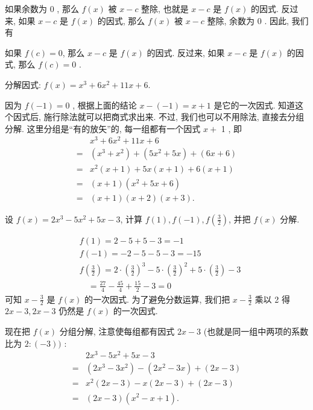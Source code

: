 如果余数为 0 , 那么 $f(x)$ 被 $x-c$ 整除, 也就是 $x-c$ 是 $f(x)$ 的因式. 反过来, 如果 $x-c$ 是 $f(x)$ 的因式, 那么 $f(x)$ 被 $x-c$ 整除, 余数为 0 . 因此, 我们有

如果 $f(c)=0$, 那么 $x-c$ 是 $f(x)$ 的因式. 反过来, 如果 $x-c$ 是 $f(x)$ 的因式, 那么 $f(c)=0$ .

\begin{example}
	分解因式: $f(x)=x^{3}+6 x^{2}+11 x+6$.
\end{example}
\begin{solution}
	因为 $f(-1)=0$ , 根据上面的结论 $x-(-1)=x+1$ 是它的一次因式. 知道这个因式后, 施行除法就可以把商式求出来. 不过, 我们也可以不用除法, 直接去分组分解. 这里分组是“有的放矢”的, 每一组都有一个因式 $x+$ 1 , 即
	\begin{align*}
		  & x^{3}+6 x^{2}+11 x+6                                      \\
		= & \left(x^{3}+x^{2}\right)+\left(5 x^{2}+5 x\right)+(6 x+6) \\
		= & x^{2}(x+1)+5 x(x+1)+6(x+1)                                \\
		= & (x+1)\left(x^{2}+5 x+6\right)                             \\
		= & (x+1)(x+2)(x+3) .
	\end{align*}
\end{solution}

\begin{example}
	设 $f(x)=2 x^{3}-5 x^{2}+5 x-3$, 计算 $f(1), f(-1), f\left(\frac{3}{2}\right)$, 并把 $f(x)$ 分解.
\end{example}
\begin{solution}
	\begin{align*}
		 & f(1)=2-5+5-3=-1                                                                                                                     \\
		 & f(-1)=-2-5-5-3=-15                                                                                                                  \\
		 & f\left(\frac{3}{2}\right)=2 \cdot\left(\frac{3}{2}\right)^{3}-5 \cdot\left(\frac{3}{2}\right)^{2}+5 \cdot\left(\frac{3}{2}\right)-3 \\
		 & \quad=\frac{27}{4}-\frac{45}{4}+\frac{15}{2}-3=0
	\end{align*}
	可知 $x-\frac{3}{2}$ 是 $f(x)$ 的一次因式. 为了避免分数运算, 我们把 $x-\frac{3}{2}$ 乘以 2 得 $2 x-3,2 x-3$ 仍然是 $f(x)$ 的一次因式.

	现在把 $f(x)$ 分组分解, 注意使每组都有因式 $2 x-3$ (也就是同一组中两项的系数比为 $2:(-3))$ :
	\begin{align*}
		  & 2 x^{3}-5 x^{2}+5 x-3                                         \\
		= & \left(2 x^{3}-3 x^{2}\right)-\left(2 x^{2}-3 x\right)+(2 x-3) \\
		= & x^{2}(2 x-3)-x(2 x-3)+(2 x-3)                                 \\
		= & (2 x-3)\left(x^{2}-x+1\right) .
	\end{align*}
\end{solution}

